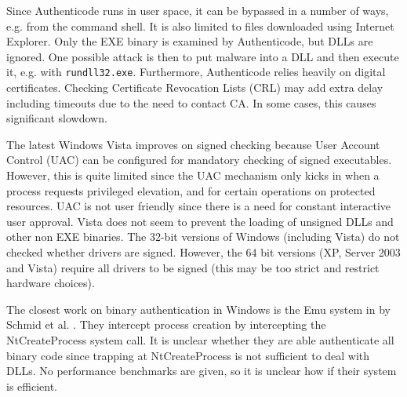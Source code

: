 Since Authenticode runs in user space,
it can be bypassed in a number of ways, e.g. from the command shell.
It is also limited to files downloaded using Internet Explorer.
Only the EXE binary is examined by Authenticode, but DLLs are ignored.
One possible attack is then to put malware into a DLL and then
execute it, e.g. with {\tt rundll32.exe}.
Furthermore, Authenticode relies heavily on digital certificates.
Checking Certificate Revocation Lists (CRL) may add extra delay 
including timeouts due to the need to contact CA.
In some cases, this causes significant slowdown.

The latest Windows Vista improves on signed checking
because User Account Control (UAC) can be configured for
mandatory checking of signed executables.
However, this is quite limited since the UAC mechanism only
kicks in when a process requests privileged elevation,
and for certain operations on protected resources.
UAC is not user friendly since there is a need for constant
interactive user approval.
Vista does not seem to prevent the loading of unsigned DLLs and 
other non EXE binaries. 
The 32-bit versions of Windows (including Vista) do not checked whether
drivers are signed.
However, the 64 bit versions (XP, Server 2003 and Vista) require
all drivers to be signed (this may be too strict and restrict hardware choices).

The closest work on binary authentication in Windows is
the Emu system in by Schmid et al. \cite{EMU}.
They intercept process creation by intercepting the NtCreateProcess system
call. It is unclear whether they are able authenticate all binary code
since trapping at NtCreateProcess is not sufficient to deal with DLLs.
No performance benchmarks are given, so it is unclear how 
if their system is efficient.

